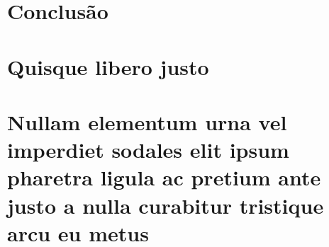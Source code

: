 \documentclass[
	12pt,				%
	openright,			%
	twoside,			%
	a4paper,			%
	english,			%
	french,				%
	spanish,			%
	brazil				%
	]{abntex2}
\begin{document}
\lipsum[24]


\chapter{Conclusão}

\lipsum[31-33]

\postextual



%
%


\begin{apendicesenv}

\partapendices

\chapter{Quisque libero justo}

\lipsum[50]

\chapter{Nullam elementum urna vel imperdiet sodales elit ipsum pharetra ligula
ac pretium ante justo a nulla curabitur tristique arcu eu metus}
\lipsum[55-57]

\end{apendicesenv}
\end{document}
